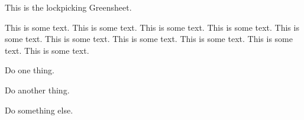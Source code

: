 \documentclass[green]{guildcamp3}
\begin{document}
	
	\name{\gLockpicking{}}
	
	
	
	
	This is the lockpicking Greensheet.
	
	This is some text.  This is some text.  This is some text.  This is
	some text.  This is some text.  This is some text.  This is some text.
	This is some text.  This is some text.  This is some text.
	
	
	\begin{enum}[Directions]
		\item Do one thing.
		\item Do another thing.
		\item Do something else.
	\end{enum}
	
	
\end{document}
